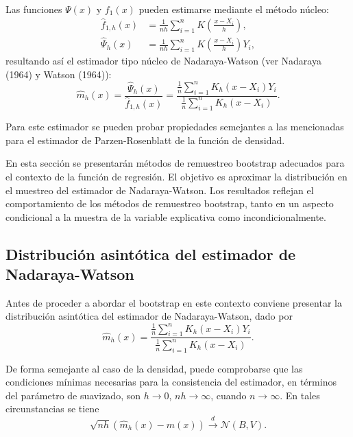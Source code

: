\documentclass[]{book}
\theoremstyle{definition}
\theoremstyle{definition}
\theoremstyle{definition}
\theoremstyle{remark}
\begin{document}
Las funciones \(\Psi \left( x \right)\) y \(f_1\left( x \right)\) pueden
estimarse mediante el método núcleo: \[\begin{aligned}
\hat{f}_{1,h}\left( x \right) &= \frac{1}{nh}\sum_{i=1}^{n}K\left( \frac{
x-X_i}{h} \right), \\
\hat{\Psi}_{h}\left( x \right) &= \frac{1}{nh}\sum_{i=1}^{n}K\left( \frac{
x-X_i}{h} \right) Y_i,
\end{aligned}\] resultando así el estimador tipo núcleo de
Nadaraya-Watson (ver Nadaraya (1964) y Watson (1964)):
\[\hat{m}_{h}\left( x \right) =\frac{\hat{\Psi}_{h}\left( x \right)}{\hat{f}
_{1,h}\left( x \right)}=\frac{\frac{1}{n}\sum_{i=1}^{n}K_{h}\left(
x-X_i \right) Y_i}{\frac{1}{n}\sum_{i=1}^{n}K_{h}\left( x-X_i \right)}.\]

Para este estimador se pueden probar propiedades semejantes a las
mencionadas para el estimador de Parzen-Rosenblatt de la función de
densidad.

En esta sección se presentarán métodos de remuestreo bootstrap adecuados
para el contexto de la función de regresión. El objetivo es aproximar la
distribución en el muestreo del estimador de Nadaraya-Watson. Los
resultados reflejan el comportamiento de los métodos de remuestreo
bootstrap, tanto en un aspecto condicional a la muestra de la variable
explicativa como incondicionalmente.

\subsection{Distribución asintótica del estimador de
Nadaraya-Watson}\label{distribucion-asintotica-del-estimador-de-nadaraya-watson}

Antes de proceder a abordar el bootstrap en este contexto conviene
presentar la distribución asintótica del estimador de Nadaraya-Watson,
dado por
\[\hat{m}_{h}\left( x \right) =\frac{\frac{1}{n}\sum_{i=1}^{n}K_{h}\left(
x-X_i \right) Y_i}{\frac{1}{n}\sum_{i=1}^{n}K_{h}\left( x-X_i \right)}.\]

De forma semejante al caso de la densidad, puede comprobarse que las
condiciones mínimas necesarias para la consistencia del estimador, en
términos del parámetro de suavizado, son \(h\rightarrow 0\),
\(nh\rightarrow \infty\), cuando \(n\rightarrow \infty\). En tales
circunstancias se tiene
\[\sqrt{nh}\left( \hat{m}_{h}\left( x \right) -m\left( x \right) \right) \overset
{d}{\rightarrow }\mathcal{N}\left( B,V \right) \text{.}\]
\end{document}
